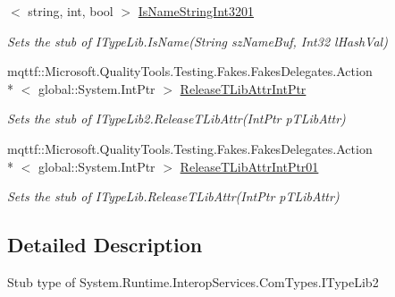 \begin{DoxyCompactItemize}
$<$ string, int, bool $>$ \hyperlink{class_system_1_1_runtime_1_1_interop_services_1_1_com_types_1_1_fakes_1_1_stub_i_type_lib2_a6cb7a7e7ed9982cdefcac7b39c635d9c}{Is\-Name\-String\-Int3201}
\begin{DoxyCompactList}\small\item\em Sets the stub of I\-Type\-Lib.\-Is\-Name(\-String sz\-Name\-Buf, Int32 l\-Hash\-Val)\end{DoxyCompactList}\item 
mqttf\-::\-Microsoft.\-Quality\-Tools.\-Testing.\-Fakes.\-Fakes\-Delegates.\-Action\\*
$<$ global\-::\-System.\-Int\-Ptr $>$ \hyperlink{class_system_1_1_runtime_1_1_interop_services_1_1_com_types_1_1_fakes_1_1_stub_i_type_lib2_a60a2f2b95cb8cf899e6c55534ecd9a2b}{Release\-T\-Lib\-Attr\-Int\-Ptr}
\begin{DoxyCompactList}\small\item\em Sets the stub of I\-Type\-Lib2.\-Release\-T\-Lib\-Attr(\-Int\-Ptr p\-T\-Lib\-Attr)\end{DoxyCompactList}\item 
mqttf\-::\-Microsoft.\-Quality\-Tools.\-Testing.\-Fakes.\-Fakes\-Delegates.\-Action\\*
$<$ global\-::\-System.\-Int\-Ptr $>$ \hyperlink{class_system_1_1_runtime_1_1_interop_services_1_1_com_types_1_1_fakes_1_1_stub_i_type_lib2_a4eab827ae7e303283dee60417720c7d4}{Release\-T\-Lib\-Attr\-Int\-Ptr01}
\begin{DoxyCompactList}\small\item\em Sets the stub of I\-Type\-Lib.\-Release\-T\-Lib\-Attr(\-Int\-Ptr p\-T\-Lib\-Attr)\end{DoxyCompactList}\end{DoxyCompactItemize}


\subsection{Detailed Description}
Stub type of System.\-Runtime.\-Interop\-Services.\-Com\-Types.\-I\-Type\-Lib2



